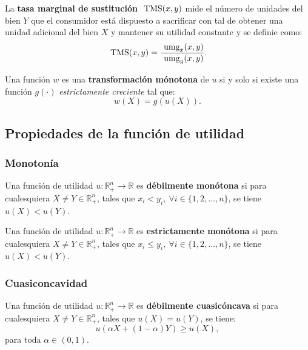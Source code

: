 \documentclass[8pt,a4paper]{extarticle}
\begin{document}
\begin{multicols}{3}
\begin{boxdef}
La \textbf{tasa marginal de sustitución} $\text{ \normalfont TMS}(x, y)$ mide el número de unidades del bien $Y$ que el consumidor está dispuesto a sacrificar con tal de obtener una unidad adicional del bien $X$ y mantener su utilidad constante y se definie como:
\[
	\text{ \normalfont TMS}(x,y)=\frac{\text{ \normalfont umg}_x (x,y)}{\text{ \normalfont umg}_y (x,y)}
.\] 
\end{boxdef}

\begin{boxdef}
Una función $w$ es una \textbf{transformación mónotona} de $u$ si y solo si existe una función $g(\cdot)$ \emph{estrictamente creciente} tal que:
	\[
		w(X) = g(u(X))
	.\] 
\end{boxdef}

\sectionbreak

\subsection{Propiedades de la función de utilidad}

\subsubsection*{Monotonía}

\begin{boxdef}
	Una función de utilidad $u : \mathbb{R}^n_+ \to \mathbb{R}$ es \textbf{débilmente monótona} si para cualesquiera $X \neq Y \in \mathbb{R}^n_+$, tales que $x_i < y_i,\ \forall i \in \{1, 2, \ldots, n\}$, se tiene $u(X) < u(Y)$.
\end{boxdef}

\begin{boxdef}
	Una función de utilidad $u : \mathbb{R}^n_+ \to \mathbb{R}$ es \textbf{estrictamente monótona} si para cualesquiera $X \neq Y \in \mathbb{R}^n_+$, tales que $x_i \le y_i,\ \forall i \in \{ 1, 2, \ldots, n \}$, se tiene $u(X) < u(Y)$.
\end{boxdef}

\subsubsection*{Cuasiconcavidad}

\begin{boxdef}
	Una función de utilidad $u : \mathbb{R}^n_+ \to \mathbb{R}$ es \textbf{débilmente cuasicóncava} si para cualesquiera $X \neq Y \in \mathbb{R}^n_+$, tales que $u(X) = u(Y)$, se tiene:
	\[
		u(\alpha X + (1 - \alpha)Y) \ge u(X)
	,\] 
	para toda $\alpha \in (0, 1)$.
\end{boxdef}


\end{multicols}
\end{document}
